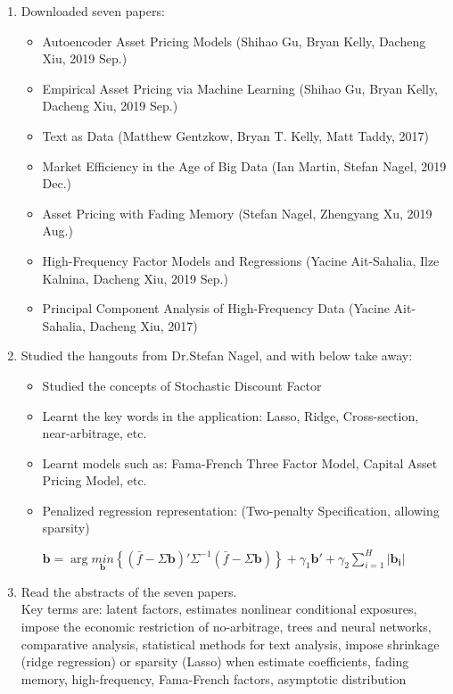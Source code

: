 \begin{enumerate}
    \item{Downloaded seven papers: 
        \begin{itemize}
            \item Autoencoder Asset Pricing Models (Shihao Gu, Bryan Kelly, Dacheng Xiu, 2019 Sep.)
            \item Empirical Asset Pricing via Machine Learning (Shihao Gu, Bryan Kelly, Dacheng Xiu, 2019 Sep.)
            \item Text as Data (Matthew Gentzkow, Bryan T. Kelly, Matt Taddy, 2017)
            \item Market Efficiency in the Age of Big Data (Ian Martin, Stefan Nagel, 2019 Dec.)
            \item Asset Pricing with Fading Memory (Stefan Nagel, Zhengyang Xu, 2019 Aug.)
            \item High-Frequency Factor Models and Regressions (Yacine Ait-Sahalia, Ilze Kalnina, Dacheng Xiu, 2019 Sep.)
            \item Principal Component Analysis of High-Frequency Data (Yacine Ait-Sahalia, Dacheng Xiu, 2017)
        \end{itemize}
    } 
    \item{ Studied the hangouts from Dr.Stefan Nagel, and with below take away: 
         \begin{itemize}
            \item Studied the concepts of Stochastic Discount Factor
            \item Learnt the key words in the application: Lasso, Ridge, Cross-section, near-arbitrage, etc.  
            \item Learnt models such as: Fama-French Three Factor Model, Capital Asset Pricing Model, etc. 
            \item Penalized regression representation: (Two-penalty Specification, allowing sparsity)
                \begin{center}
                $  \mathbf{b} = \arg \underset{\mathbf{b}}{min}    \left \{   { \left(   \bar{f} - \Sigma \mathbf{b}  \right )  }'  {\Sigma}^{-1}  \left (  \bar{f} - \Sigma \mathbf{b} \right )  \right \} + \gamma_1 {\mathbf{b}}'  +  \gamma_2  \sum_{i=1}^{H}\left |  \mathbf{b_i} \right |  $
                \end{center}
           
         \end{itemize}
    }
    
    \item{Read the abstracts of the seven papers. \\
    Key terms  are: latent factors, estimates nonlinear conditional exposures, impose the economic restriction of no-arbitrage, trees and neural networks, comparative analysis, statistical methods for text analysis, impose shrinkage (ridge regression) or sparsity (Lasso) when estimate coefficients, fading memory, high-frequency, Fama-French factors, asymptotic distribution}
    

\end{enumerate}
